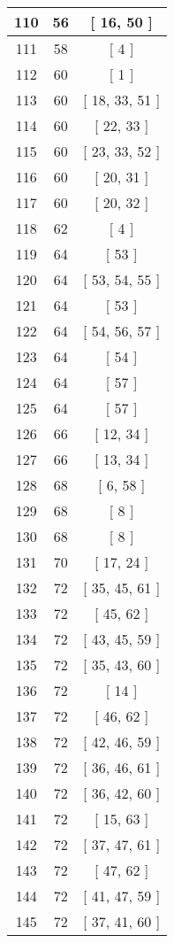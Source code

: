 \begin{center}
\begin{longtable}[H]{|| c c c ||}
\hline
110 & 56 & [ 16, 50 ] \\ 
\hline
111 & 58 & [ 4 ] \\ 
\hline
112 & 60 & [ 1 ] \\ 
\hline
113 & 60 & [ 18, 33, 51 ] \\ 
\hline
114 & 60 & [ 22, 33 ] \\ 
\hline
115 & 60 & [ 23, 33, 52 ] \\ 
\hline
116 & 60 & [ 20, 31 ] \\ 
\hline
117 & 60 & [ 20, 32 ] \\ 
\hline
118 & 62 & [ 4 ] \\ 
\hline
119 & 64 & [ 53 ] \\ 
\hline
120 & 64 & [ 53, 54, 55 ] \\ 
\hline
121 & 64 & [ 53 ] \\ 
\hline
122 & 64 & [ 54, 56, 57 ] \\ 
\hline
123 & 64 & [ 54 ] \\ 
\hline
124 & 64 & [ 57 ] \\ 
\hline
125 & 64 & [ 57 ] \\ 
\hline
126 & 66 & [ 12, 34 ] \\ 
\hline
127 & 66 & [ 13, 34 ] \\ 
\hline
128 & 68 & [ 6, 58 ] \\ 
\hline
129 & 68 & [ 8 ] \\ 
\hline
130 & 68 & [ 8 ] \\ 
\hline
131 & 70 & [ 17, 24 ] \\ 
\hline
132 & 72 & [ 35, 45, 61 ] \\ 
\hline
133 & 72 & [ 45, 62 ] \\ 
\hline
134 & 72 & [ 43, 45, 59 ] \\ 
\hline
135 & 72 & [ 35, 43, 60 ] \\ 
\hline
136 & 72 & [ 14 ] \\ 
\hline
137 & 72 & [ 46, 62 ] \\ 
\hline
138 & 72 & [ 42, 46, 59 ] \\ 
\hline
139 & 72 & [ 36, 46, 61 ] \\ 
\hline
140 & 72 & [ 36, 42, 60 ] \\ 
\hline
141 & 72 & [ 15, 63 ] \\ 
\hline
142 & 72 & [ 37, 47, 61 ] \\ 
\hline
143 & 72 & [ 47, 62 ] \\ 
\hline
144 & 72 & [ 41, 47, 59 ] \\ 
\hline
145 & 72 & [ 37, 41, 60 ] \\ 

\end{longtable}
\end{center}
